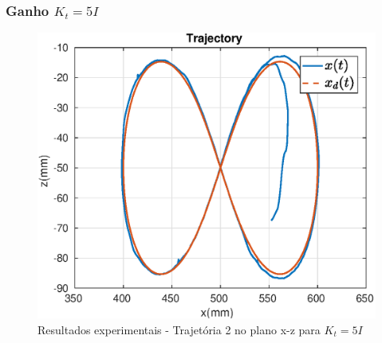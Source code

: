\subsubsection{Ganho ${K}_t = 5{I}$}

\begin{figure}[H]
\centering
  \includegraphics[width=0.5\linewidth]{./img/traj_2_k5/traj.eps}
  \caption{Resultados experimentais - Trajetória 2 no plano x-z para ${K}_t = 5{I}$}
  \label{fig:sub1}
\end{figure}%

